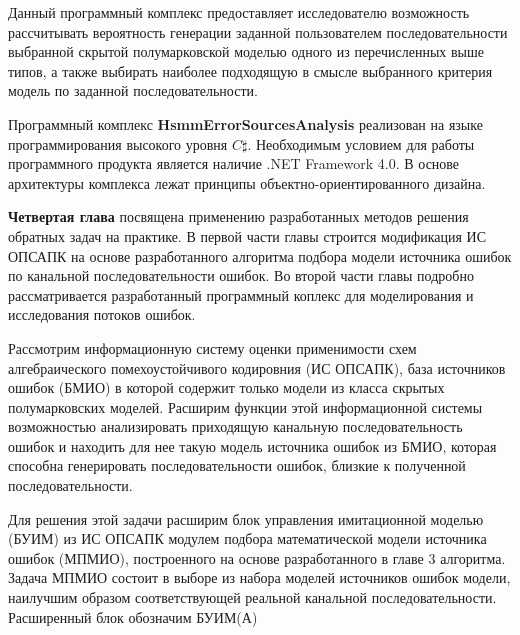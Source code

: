 \documentclass[twoside,12pt]{article}
\begin{document}
Данный программный комплекс предоставляет исследователю возможность рассчитывать вероятность генерации заданной пользователем последовательности выбранной скрытой полумарковской моделью одного из перечисленных выше типов, а также выбирать наиболее подходящую в смысле выбранного критерия модель по заданной последовательности.

Программный комплекс \textbf{HsmmErrorSourcesAnalysis} реализован на языке программирования высокого уровня $C\sharp$. Необходимым условием для работы программного продукта является наличие .NET Framework 4.0. В основе архитектуры комплекса лежат принципы объектно-ориентированного дизайна.

\textbf{Четвертая глава} посвящена применению разработанных методов решения обратных задач на практике. В первой части главы строится модификация ИС ОПСАПК на основе разработанного алгоритма подбора модели источника ошибок по канальной последовательности ошибок. Во второй части главы подробно рассматривается разработанный программный коплекс для моделирования и исследования потоков ошибок.

Рассмотрим информационную систему оценки применимости схем алгебраического помехоустойчивого кодировния (ИС ОПСАПК), база источников ошибок (БМИО) в которой содержит только модели из класса скрытых полумарковских моделей. Расширим функции этой информационной системы возможностью анализировать приходящую канальную последовательность ошибок и находить для нее такую модель источника ошибок из БМИО, которая способна генерировать последовательности ошибок, близкие к полученной последовательности.

Для решения этой задачи расширим блок управления имитационной моделью (БУИМ) из ИС ОПСАПК модулем подбора математической модели источника ошибок (МПМИО), построенного на основе разработанного в главе 3 алгоритма. Задача МПМИО состоит в выборе из набора моделей источников ошибок модели, наилучшим образом соответствующей реальной канальной последовательности. Расширенный блок обозначим БУИМ(А)
\end{document}
